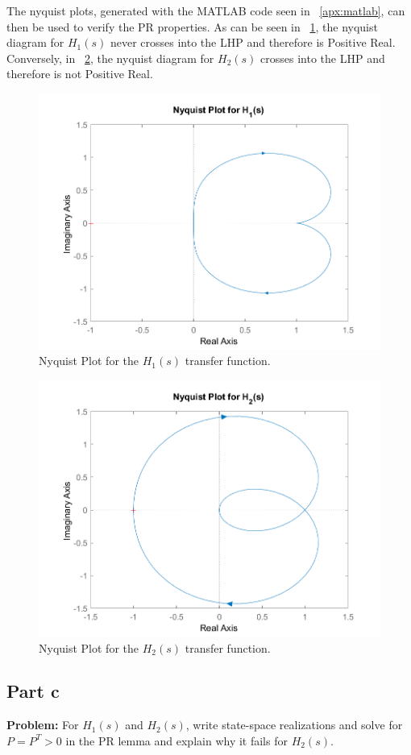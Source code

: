 \documentclass[letter]{article}
\begin{document}
The nyquist plots, generated with the MATLAB code seen in \appendixname \ \ref{apx:matlab}, can then be used to verify the PR properties. As can be seen in \figurename \ \ref{fig:pblm2h1}, the nyquist diagram for $H_1(s)$ never crosses into the LHP and therefore is Positive Real. Conversely, in \figurename \ \ref{fig:pblm2h2}, the nyquist diagram for $H_2(s)$ crosses into the LHP and therefore is not Positive Real.

\begin{figure}[p]
	\centering
	\includegraphics[width=0.7\linewidth]{fig/pblm2_H1}
	\caption{Nyquist Plot for the $H_1(s)$ transfer function.}
	\label{fig:pblm2h1}
\end{figure}


\begin{figure}[p]
	\centering
	\includegraphics[width=0.7\linewidth]{fig/pblm2_H2}
	\caption{Nyquist Plot for the $H_2(s)$ transfer function.}
	\label{fig:pblm2h2}
\end{figure}



\newpage
\subsection{Part c}
\textbf{Problem:}
For $H_1(s)$ and $H_2(s)$, write state-space realizations and solve for $P=P^T > 0$ in the PR lemma and explain why it fails for $H_2(s)$.\\
\end{document}
